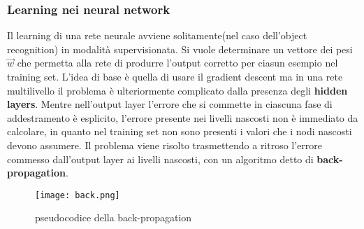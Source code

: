 \subsubsection{Learning nei neural network}
Il learning di una rete neurale avviene solitamente(nel caso dell'object recognition) in modalità supervisionata.  Si vuole determinare un vettore dei pesi $\vec{w}$ che permetta alla rete di produrre l'output corretto per ciasun esempio nel training set.
L'idea di base è quella di usare il gradient descent ma in una rete multilivello il problema è ulteriormente complicato dalla presenza degli \textbf{hidden layers}. Mentre nell'output layer l'errore che si commette in ciascuna fase di addestramento è esplicito, l'errore presente nei livelli nascosti
non è immediato da calcolare, in quanto nel training set non sono presenti i valori che i nodi nascosti devono assumere. Il problema viene risolto trasmettendo a ritroso
l'errore commesso dall'output layer ai livelli nascosti, con un algoritmo detto di \textbf{back-propagation}.
\begin{figure}[h]
  \texttt{[image: back.png]}
  \caption{pseudocodice della back-propagation\cite{back}}
  \label{fig:back}
\end{figure}
